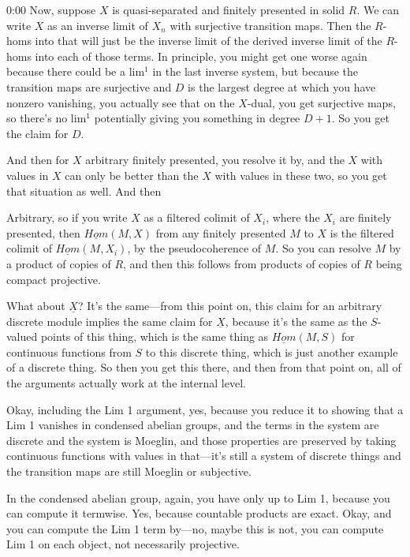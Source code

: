 \begin{unfinished}{0:00}
Now, suppose $X$ is quasi-separated and finitely presented in solid $R$. We can write $X$ as an inverse limit of $X_n$ with surjective transition maps. Then the $R$-homs into that will just be the inverse limit of the derived inverse limit of the $R$-homs into each of those terms. In principle, you might get one worse again because there could be a lim$^1$ in the last inverse system, but because the transition maps are surjective and $D$ is the largest degree at which you have nonzero vanishing, you actually see that on the $X$-dual, you get surjective maps, so there's no lim$^1$ potentially giving you something in degree $D+1$. So you get the claim for $D$.

And then for $X$ arbitrary finitely presented, you resolve it by, and the $X$ with values in $X$ can only be better than the $X$ with values in these two, so you get that situation as well. And then

Arbitrary, so if you write $X$ as a filtered colimit of $X_i$, where the $X_i$ are finitely presented, then $\underline{Hom}(M, X)$ from any finitely presented $M$ to $X$ is the filtered colimit of $\underline{Hom}(M, X_i)$, by the pseudocoherence of $M$. So you can resolve $M$ by a product of copies of $R$, and then this follows from products of copies of $R$ being compact projective.

What about $\underline{X}$? It's the same---from this point on, this claim for an arbitrary discrete module implies the same claim for $\underline{X}$, because it's the same as the $S$-valued points of this thing, which is the same thing as $\underline{Hom}(M, S)$ for continuous functions from $S$ to this discrete thing, which is just another example of a discrete thing. So then you get this there, and then from that point on, all of the arguments actually work at the internal level.

Okay, including the Lim 1 argument, yes, because you reduce it to showing that a Lim 1 vanishes in condensed abelian groups, and the terms in the system are discrete and the system is Moeglin, and those properties are preserved by taking continuous functions with values in that---it's still a system of discrete things and the transition maps are still Moeglin or subjective.

In the condensed abelian group, again, you have only up to Lim 1, because you can compute it termwise. Yes, because countable products are exact. Okay, and you can compute the Lim 1 term by---no, maybe this is not, you can compute Lim 1 on each object, not necessarily projective.


\end{unfinished}
